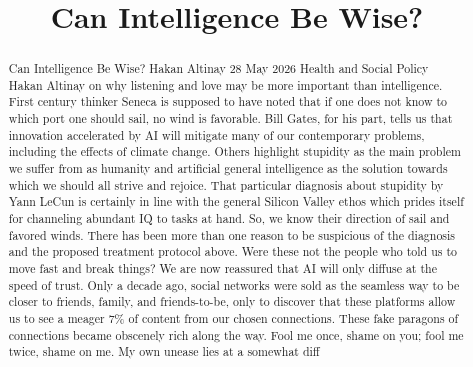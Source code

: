 \title{Can Intelligence Be Wise?}

\maketitle

\begin{abstract}
Can Intelligence Be Wise? Hakan Altinay 28 May 2026 Health and Social Policy Hakan Altinay on why listening and love may be more important than intelligence. First century thinker Seneca is supposed to have noted that if one does not know to which port one should sail, no wind is favorable. Bill Gates, for his part, tells us that innovation accelerated by AI will mitigate many of our contemporary problems, including the effects of climate change. Others highlight stupidity as the main problem we suffer from as humanity and artificial general intelligence as the solution towards which we should all strive and rejoice. That particular diagnosis about stupidity by Yann LeCun is certainly in line with the general Silicon Valley ethos which prides itself for channeling abundant IQ to tasks at hand. So, we know their direction of sail and favored winds. There has been more than one reason to be suspicious of the diagnosis and the proposed treatment protocol above. Were these not the people who told us to move fast and break things? We are now reassured that AI will only diffuse at the speed of trust. Only a decade ago, social networks were sold as the seamless way to be closer to friends, family, and friends-to-be, only to discover that these platforms allow us to see a meager 7\% of content from our chosen connections. These fake paragons of connections became obscenely rich along the way. Fool me once, shame on you; fool me twice, shame on me. My own unease lies at a somewhat diff
\end{abstract}

